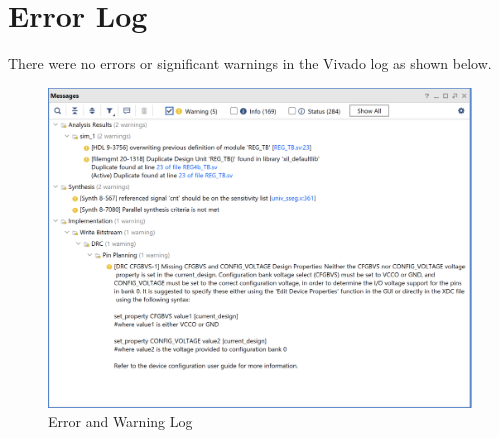 \documentclass[12pt]{article}
\begin{document}
\newpage

\section{Error Log}

There were no errors or significant warnings in the Vivado log as shown below.

\begin{figure}[h]
    \centering
    \includegraphics[width=.8\textwidth]{Figures/CPE 133 Lab 5 Error Log.png}
    \caption{Error and Warning Log}
    \label{fig:warninglog}
\end{figure}
\end{document}
